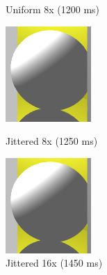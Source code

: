 \begin{figure}[H]
    \caption{Uniform 8x (1200 ms)}
\endminipage\hfill
{}
    \centering
    \includegraphics[width=\linewidth]{img/antialiasing/sto8x.png}
    \caption{Jittered 8x (1250 ms)}
\endminipage\hfill
{}
    \centering
    \includegraphics[width=\linewidth]{img/antialiasing/sto16x.png}
    \caption{Jittered 16x (1450 ms)}
\endminipage\hfill
\end{figure}


